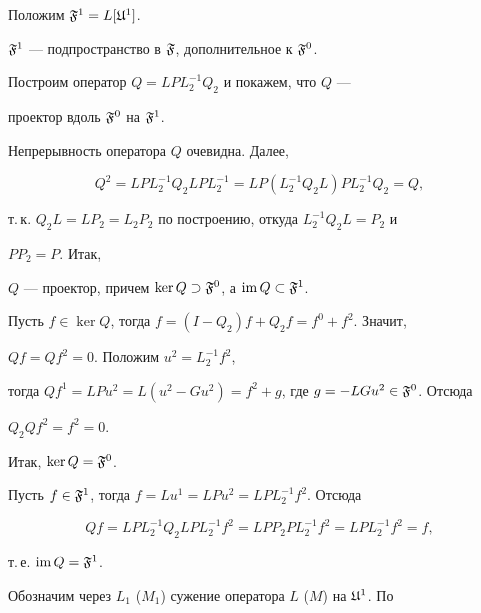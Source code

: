 Положим $\frak F^1=L[\frak U^1]$. 


 




\begin{lems} $\frak F^1$ --- подпространство в $\frak F$, дополнительное к $\frak F^0$. 


\end{lems} 


 


\begin{pf} Построим оператор $Q=LPL_2^{-1}Q_2$ и покажем, что $Q$ --- 


проектор вдоль $\frak F^0$ на $\frak F^1$. 


 


Непрерывность оператора $Q$ очевидна. Далее, 


$$ 


Q^2=LPL_2^{-1}Q_2LPL_2^{-1} = LP(L_2^{-1}Q_2L)PL_2^{-1}Q_2 = Q, 


$$ 


т.\,к. $Q_2L=LP_2=L_2P_2$ по построению, откуда $L_2^{-1}Q_2L=P_2$ и 


$PP_2=P$. Итак, 


$Q$ --- проектор, причем $\ker Q\supset\frak F^0$, а $\operatorname{im} Q\subset\frak F^1$. 


 


Пусть $f\in\ker Q$, тогда $f=(I-Q_2)f+Q_2f=f^0+f^2$. Значит, 


$Qf=Qf^2=0$. Положим $u^2=L_2^{-1}f^2$, 


тогда $Qf^1=LPu^2=L(u^2-Gu^2)=f^2+g$, где $g=-LGu^2\in\frak F^0$. Отсюда 


$Q_2Qf^2=f^2=0$. 


Итак, $\ker Q=\frak F^0$. 


 


Пусть $f\in\frak F^1$, тогда $f=Lu^1=LPu^2=LPL_2^{-1}f^2$. Отсюда 


$$ 


Qf=LPL_2^{-1}Q_2LPL_2^{-1}f^2 = LPP_2PL_2^{-1}f^2 = LPL_2^{-1}f^2 = f, 


$$ 


т.\,е. $\operatorname{im} Q=\frak F^1$. 


\end{pf} 


 


Обозначим через $L_1$ ($M_1$) сужение оператора $L$ ($M$) на $\frak U^1$. По 


